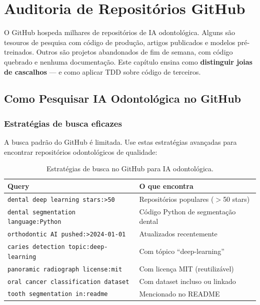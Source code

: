 \chapter{Auditoria de Repositórios GitHub}
\label{cap:auditoria-github}
\nivelquatro

O GitHub hospeda milhares de repositórios de IA odontológica. Alguns são
tesouros de pesquisa com código de produção, artigos publicados e modelos
pré-treinados. Outros são projetos abandonados de fim de semana, com
código quebrado e nenhuma documentação. Este capítulo ensina como
\textbf{distinguir joias de cascalhos} — e como aplicar TDD sobre
código de terceiros.

\section{Como Pesquisar IA Odontológica no GitHub}

\subsection{Estratégias de busca eficazes}

A busca padrão do GitHub é limitada. Use estas estratégias avançadas
para encontrar repositórios odontológicos de qualidade:

\begin{table}[H]
  \centering
  \caption{Estratégias de busca no GitHub para IA odontológica.}
  \label{tab:github-search}
  \begin{tabularx}{\textwidth}{lX}
    \toprule
    \textbf{Query} & \textbf{O que encontra} \\
    \midrule
    \texttt{dental deep learning stars:>50} & Repositórios populares ($>$50 stars) \\
    \texttt{dental segmentation language:Python} & Código Python de segmentação dental \\
    \texttt{orthodontic AI pushed:>2024-01-01} & Atualizados recentemente \\
    \texttt{caries detection topic:deep-learning} & Com tópico ``deep-learning'' \\
    \texttt{panoramic radiograph license:mit} & Com licença MIT (reutilizável) \\
    \texttt{oral cancer classification dataset} & Com dataset incluso ou linkado \\
    \texttt{tooth segmentation in:readme} & Mencionado no README \\
    \bottomrule
  \end{tabularx}
\end{table}

